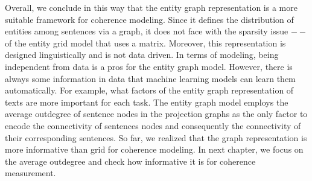 Overall, we conclude in this way that the entity graph representation is a  more suitable framework for coherence modeling.  
Since it defines the distribution of entities among sentences via a graph, it does not face with the sparsity issue $- -$ of the entity grid model that uses a matrix. 
Moreover, this representation is designed linguistically and is not data driven. 
In terms of modeling, being independent from data is a pros for the entity graph model. 
However, there is always some information in data that machine learning models can learn them automatically. 
For example, what factors of the entity graph representation of texts are more important for each task. 
The entity graph model employs the average outdegree of sentence nodes in the projection graphs as the only factor to encode the connectivity of sentences nodes and consequently the connectivity of their corresponding sentences. 
So far, we realized that the graph representation is more informative than grid for coherence modeling.
In next chapter, we focus on the average outdegree and check how informative it is for coherence measurement. 

































